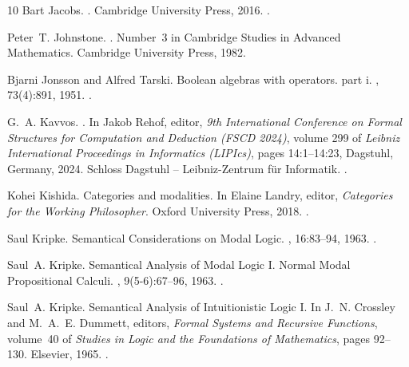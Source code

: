 \documentclass[10pt,a4paper]{article}
\begin{document}
\begin{thebibliography}{10}
Bart Jacobs.
.
\newblock Cambridge University Press, 2016.
\newblock \href {https://doi.org/10.1017/CBO9781316823187}
  {}.

Peter~T. Johnstone.
.
\newblock Number~3 in Cambridge Studies in Advanced Mathematics. Cambridge
  University Press, 1982.

Bjarni Jonsson and Alfred Tarski.
\newblock Boolean algebras with operators. part i.
, 73(4):891, 1951.
\newblock \href {https://doi.org/10.2307/2372123} {}.

G.~A. Kavvos.
.
\newblock In Jakob Rehof, editor, {\em 9th International Conference on Formal
  Structures for Computation and Deduction (FSCD 2024)}, volume 299 of {\em
  Leibniz International Proceedings in Informatics (LIPIcs)}, pages
  14:1--14:23, Dagstuhl, Germany, 2024. Schloss Dagstuhl -- Leibniz-Zentrum
  f{\"u}r Informatik.
\newblock \href {https://doi.org/10.4230/LIPIcs.FSCD.2024.14}
  {}.

Kohei Kishida.
\newblock Categories and modalities.
\newblock In Elaine Landry, editor, {\em Categories for the Working
  Philosopher}. Oxford University Press, 2018.
\newblock \href {https://doi.org/10.1093/oso/9780198748991.003.0009}
  {}.

Saul Kripke.
\newblock Semantical {Considerations} on {Modal} {Logic}.
, 16:83--94, 1963.
\newblock \href {https://doi.org/10.1002/malq.19630090502}
  {}.

Saul~A. Kripke.
\newblock Semantical {Analysis} of {Modal} {Logic} {I}. {Normal} {Modal}
  {Propositional} {Calculi}.
, 9(5-6):67--96, 1963.
\newblock \href {https://doi.org/10.1002/malq.19630090502}
  {}.

Saul~A. Kripke.
\newblock Semantical {Analysis} of {Intuitionistic} {Logic} {I}.
\newblock In J.~N. Crossley and M.~A.~E. Dummett, editors, {\em Formal
  {Systems} and {Recursive} {Functions}}, volume~40 of {\em Studies in {Logic}
  and the {Foundations} of {Mathematics}}, pages 92--130. Elsevier, 1965.
\newblock \href {https://doi.org/10.1016/S0049-237X(08)71685-9}
  {}.


\end{thebibliography}
\end{document}
